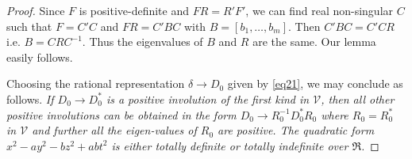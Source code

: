 \begin{proof}
Since $F$ is positive-definite and $FR=R'F'$, we can find real
non-singular $C$ such that $F=C'C$ and $FR=C'BC$ with $B=[b_1,\ldots,
  b_m]$. \pageoriginale Then $C'BC = C'CR$ i.e. $B=CRC^{-1}$. Thus the
eigenvalues of $B$ and $R$ are the same. Our lemma easily follows.

Choosing the rational representation $\delta \rightarrow D_0$ given
by \eqref{eq21}, we may conclude as follows. {\em If $D_0 \rightarrow
  D^{\ast}_0$ is a positive involution of the first kind in
  $\mathscr{V}$, then all other positive involutions can be obtained
  in the form $D_0 \rightarrow R^{-1}_0 D^{\ast}_0 R_0$ where $R_0 =
  R^{\ast}_0$ in $\mathscr{V}$ and further all the eigen-values of
  $R_0$ are positive. The quadratic form $x^2-ay^2-bz^2 + abt^2$ is
  either totally definite or totally indefinite over $\mathfrak{R}$.}


\end{proof}
